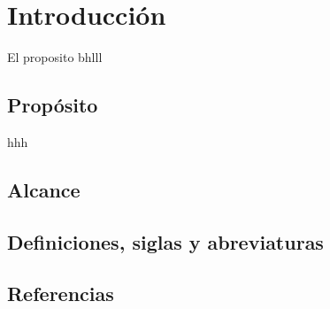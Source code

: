 \chapter{Introducción}
El proposito
bhlll
\section{Propósito}
hhh
\section{Alcance}

\section{Definiciones, siglas y abreviaturas}

\section{Referencias}